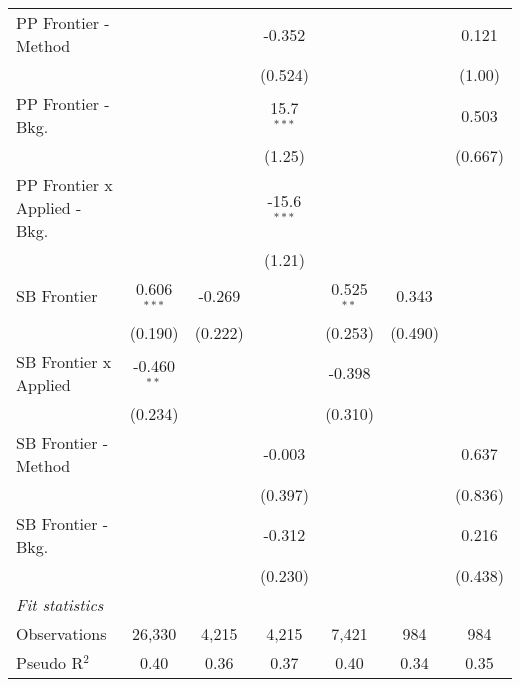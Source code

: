 \begin{tabular}{lcccccc}
   PP Frontier - Method           &               &               & -0.352        &              &         & 0.121\\   
                                  &               &               & (0.524)       &              &         & (1.00)\\   
   PP Frontier - Bkg.             &               &               & 15.7$^{***}$  &              &         & 0.503\\   
                                  &               &               & (1.25)        &              &         & (0.667)\\   
   PP Frontier x Applied - Bkg.   &               &               & -15.6$^{***}$ &              &         &   \\   
                                  &               &               & (1.21)        &              &         &   \\   
   SB Frontier                    & 0.606$^{***}$ & -0.269        &               & 0.525$^{**}$ & 0.343   &   \\   
                                  & (0.190)       & (0.222)       &               & (0.253)      & (0.490) &   \\   
   SB Frontier x Applied          & -0.460$^{**}$ &               &               & -0.398       &         &   \\   
                                  & (0.234)       &               &               & (0.310)      &         &   \\   
   SB Frontier - Method           &               &               & -0.003        &              &         & 0.637\\   
                                  &               &               & (0.397)       &              &         & (0.836)\\   
   SB Frontier - Bkg.             &               &               & -0.312        &              &         & 0.216\\   
                                  &               &               & (0.230)       &              &         & (0.438)\\   
   \midrule
   \emph{Fit statistics}\\
   Observations                   & 26,330        & 4,215         & 4,215         & 7,421        & 984     & 984\\  
   Pseudo R$^2$                   & 0.40          & 0.36          & 0.37          & 0.40         & 0.34    & 0.35\\  
   

\end{tabular}
